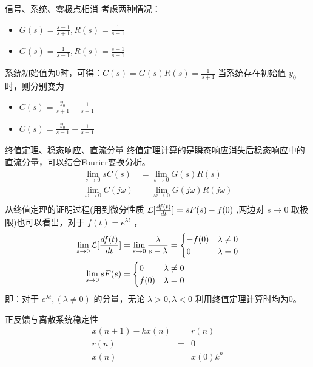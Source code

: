 \documentclass[presentation]{beamer}
\begin{document}
\begin{frame}[label={sec:orgcbe1435}]{信号、系统、零极点相消}
考虑两种情况：

\begin{itemize}
\item \(G(s)=\frac{s-1}{s+1},R(s)=\frac{1}{s-1}\)
\item \(G(s)=\frac{1}{s-1},R(s)=\frac{s-1}{s+1}\)
\end{itemize}

系统初始值为0时，可得：\(C(s)=G(s)R(s)=\frac{1}{s+1}\)
当系统存在初始值 \(y_0\) 时，则分别变为

\begin{itemize}
\item \(C(s)=\frac{y_0}{s+1}+\frac{1}{s+1}\)
\item \(C(s)=\frac{y_0}{s-1}+\frac{1}{s+1}\)
\end{itemize}
\end{frame}

\begin{frame}[label={sec:org989224a}]{终值定理、稳态响应、直流分量}
终值定理计算的是瞬态响应消失后稳态响应中的直流分量，可以结合Fourier变换分析。
\begin{align*}
\lim_{s\to 0}sC(s) &= \lim_{s\to 0}G(s)R(s) \\
\lim_{\omega\to 0}C(j\omega) &= \lim_{\omega\to 0}G(j\omega)R(j\omega)\\
\end{align*}
从终值定理的证明过程(用到微分性质 \({\cal L}[\frac{df(t)}{dt}]=sF(s)-f(0)\) ,两边对 \(s\to 0\) 取极限)也可以看出，对于 \(f(t)=e^{\lambda t}\) ，
\begin{align*}
\lim_{s\to 0}{\cal L} [\frac{df(t)}{dt}]&=\lim_{s\to 0}\frac{\lambda}{s-\lambda}=
\begin{cases}
-f(0)  & \lambda\neq 0\\
0   & \lambda=0
\end{cases}\\
\lim_{s\to 0} sF(s) &=
\begin{cases}
0  & \lambda\neq 0\\
f(0)   & \lambda=0
\end{cases}
\end{align*}
即：对于 \(e^{\lambda t},(\lambda\neq0)\) 的分量，无论 \(\lambda>0,\lambda<0\) 利用终值定理计算时均为0。
\end{frame}
\begin{frame}[label={sec:org011e609}]{正反馈与离散系统稳定性}
\begin{eqnarray*}
x(n+1)-kx(n) &=& r(n) \\
r(n) & = & 0 \\
x(n) &=& x(0)k^n
\end{eqnarray*}
\end{frame}
\end{document}
